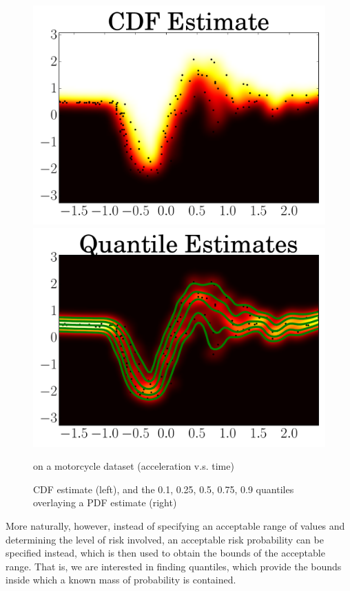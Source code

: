 \documentclass[twoside]{article} \usepackage{aistats2017}
\theoremstyle{definition}
\theoremstyle{theorem}
\begin{document}
	\begin{figure}
		\begin{center}
			\includegraphics[width=0.48\columnwidth]{figures/mcquantiles_1}
			\includegraphics[width=0.48\columnwidth]{figures/mcquantiles_2}
		\end{center}
		\caption{\small CDF estimate (left), and the 0.1, 0.25, 0.5, 0.75, 0.9 quantiles overlaying a PDF estimate (right)} on a motorcycle dataset (acceleration v.s. time)
		\label{fig:quantile_regression_motorcycle}
	\end{figure}
	
	More naturally, however, instead of specifying an acceptable range of values and determining the level of risk involved, an acceptable risk probability can be specified instead, which is then used to obtain the bounds of the acceptable range. That is, we are interested in finding quantiles, which provide the bounds inside which a known mass of probability is contained. 
	
	
%
\end{document}
